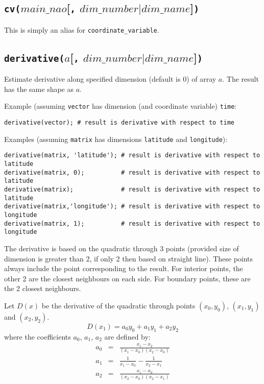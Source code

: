 \subsection{\texttt{cv(}$main\_nao$[\texttt{,} $\mathit{dim\_number}|\mathit{dim\_name}$]\texttt{)}}
    \label{nap-function-lib-cv} 

This is simply an alias for 
  \texttt{coordinate\_variable}.

\subsection{\texttt{derivative(}$a$[\texttt{,} $\mathit{dim\_number}|\mathit{dim\_name}$]\texttt{)}}
      \label{nap-function-lib-derivative} 

Estimate derivative along specified dimension (default is 0) of array $a$.
The result has the same shape as $a$.

Example (assuming \texttt{vector} has dimension (and coordinate variable) \texttt{time}:
\begin{verbatim}
derivative(vector); # result is derivative with respect to time
\end{verbatim}

Examples (assuming \texttt{matrix} has dimensions \texttt{latitude} and \texttt{longitude}):
  \begin{verbatim}
derivative(matrix, 'latitude'); # result is derivative with respect to latitude
derivative(matrix, 0);          # result is derivative with respect to latitude
derivative(matrix);             # result is derivative with respect to latitude
derivative(matrix,'longitude'); # result is derivative with respect to longitude
derivative(matrix, 1);          # result is derivative with respect to longitude
\end{verbatim}

The derivative is based on the
quadratic through 3 points (provided size of dimension is greater than 2, 
if only 2 then based on straight line). 
These points always include the point corresponding to the result.
For interior points, the other 2 are the closest neighbours on each side.
For boundary points, these are the 2 closest neighbours.

Let $D(x)$ be the derivative of the quadratic through points 
$(x_0,y_0)$,
$(x_1,y_1)$
and
$(x_2,y_2)$.
\[ D(x_1) = a_0 y_0 + a_1 y_1 + a_2 y_2 \]
where the coefficients $a_0$, $a_1$, $a_2$ are defined by:
\begin{eqnarray*}
a_0 & = & \frac{x_1 - x_2}{(x_1 - x_0)(x_2 - x_0)} \\
a_1 & = & \frac{1}{x_1 - x_0} - \frac{1}{x_2 - x_1} \\
a_2 & = & \frac{x_1 - x_0}{(x_2 - x_0)(x_2 - x_1)}
\end{eqnarray*}

